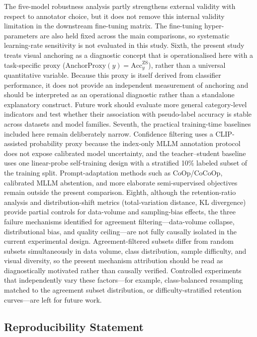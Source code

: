 \documentclass[10pt,letterpaper]{article}
\begin{document}
The five-model robustness analysis partly strengthens external validity
with respect to annotator choice, but it does not remove this internal
validity limitation in the downstream fine-tuning matrix.
The fine-tuning hyper-parameters are also held fixed across the main
comparisons, so systematic learning-rate sensitivity is not evaluated
in this study.
Sixth, the present study treats visual anchoring as a
diagnostic concept that is operationalised here with a task-specific
proxy ($\mathrm{AnchorProxy}(y)=\mathrm{Acc}^{\mathrm{ZS}}_{y}$), rather
than a universal quantitative variable.
Because this proxy is itself derived from classifier performance, it
does not provide an independent measurement of anchoring and should be
interpreted as an operational diagnostic rather than a standalone
explanatory construct.
Future work should evaluate more general category-level indicators and
test whether their association with pseudo-label accuracy is stable
across datasets and model families.
Seventh, the practical training-time baselines included here remain
deliberately narrow. Confidence filtering uses a CLIP-assisted
probability proxy because the index-only MLLM annotation protocol does
not expose calibrated model uncertainty, and the teacher--student
baseline uses one linear-probe self-training design with a stratified
10\% labeled subset of the training split.
Prompt-adaptation methods such as CoOp/CoCoOp, calibrated MLLM
abstention, and more elaborate semi-supervised objectives remain
outside the present comparison.
Eighth, although the retention-ratio analysis and distribution-shift
metrics (total-variation distance, KL divergence) provide partial
controls for data-volume and sampling-bias effects, the three failure
mechanisms identified for agreement filtering---data-volume collapse,
distributional bias, and quality ceiling---are not fully causally
isolated in the current experimental design. Agreement-filtered
subsets differ from random subsets simultaneously in data volume,
class distribution, sample difficulty, and visual diversity, so the
present mechanism attribution should be read as diagnostically
motivated rather than causally verified. Controlled experiments that
independently vary these factors---for example, class-balanced
resampling matched to the agreement subset distribution, or
difficulty-stratified retention curves---are left for future work.

\subsection*{Reproducibility Statement}
\label{sec:repro}
\end{document}
